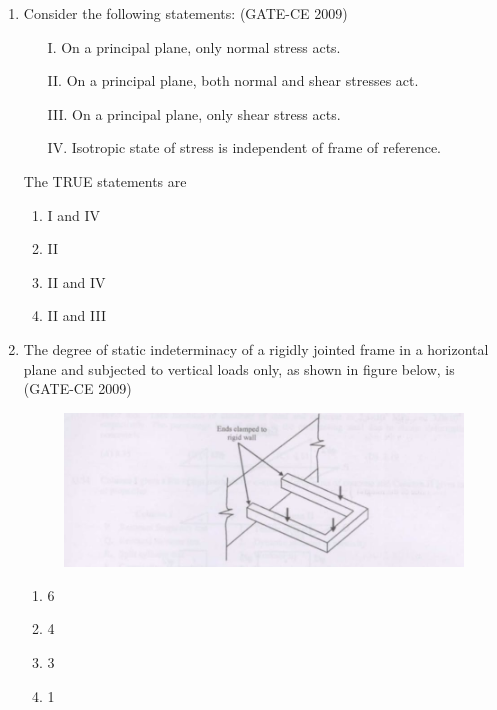 \documentclass[journal,12pt,onecolumn]{article}
\theoremstyle{remark}
\begin{document}
\begin{enumerate}
    \item Consider the following statements: (GATE-CE 2009)
    \begin{itemize}
        \item[I.] On a principal plane, only normal stress acts.
        \item[II.] On a principal plane, both normal and shear stresses act.
        \item[III.] On a principal plane, only shear stress acts.
        \item[IV.] Isotropic state of stress is independent of frame of reference.
    \end{itemize}
    The TRUE statements are
    \begin{multicols}{2}
    \begin{enumerate}
        \item I and IV 
        \item II 
        \item II and IV 
        \item II and III
    \end{enumerate}
\end{multicols}
    
    \item The degree of static indeterminacy of a rigidly jointed frame in a horizontal plane and subjected to vertical loads only, as shown in figure below, is (GATE-CE 2009)
    \begin{figure}[H]
    \centering
    \includegraphics[width=0.7\columnwidth]{figs/image.jpg}
    \caption{}
    \label{fig:placeholder}
    \end{figure}
    \begin{multicols}{4}
    \begin{enumerate}
        \item 6 
        \item 4 
        \item 3 
        \item 1
    \end{enumerate}
\end{multicols}
    

\end{enumerate}
\end{document}
